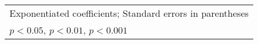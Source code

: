 {\begin{tabular}{l*{72}{c}}
\hline\hline
\multicolumn{73}{l}{\footnotesize Exponentiated coefficients; Standard errors in parentheses}\\
\multicolumn{73}{l}{\footnotesize \sym{*} \(p<0.05\), \sym{**} \(p<0.01\), \sym{***} \(p<0.001\)}\\
\end{tabular}
}
